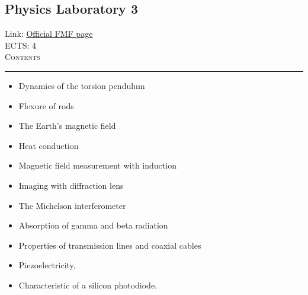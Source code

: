 \documentclass[11pt, a4paper]{article}
\newenvironment{course}[3]{
\subsection{#1}%
Link: \href{#2}{Official FMF page}\\%
ECTS: #3%
\vspace{1ex}
\\
{\large \textsc{Contents}}\\[-0.9ex]%
\rule{\textwidth}{0.5pt}
\vspace{-3ex}
}
{}
\newenvironment{chapter}[1]{
\begin{tcolorbox}[title=#1, breakable]
}
{\end{tcolorbox}}
\begin{document}
\begin{course}{Physics Laboratory 3}{https://www.fmf.uni-lj.si/en/study-physics/programmes/1fiz/2020/7000777/courses/1144/}{4}
    \label{physics-laboratory-3}

    \begin{chapter}{Experiments}
        \begin{itemize}
        
            \item Dynamics of the torsion pendulum

            \item Flexure of rods

            \item The Earth's magnetic field

            \item Heat conduction

            \item Magnetic field measurement with induction

            \item Imaging with diffraction lens

            \item The Michelson interferometer

            \item Absorption of gamma and beta radiation

            \item Properties of transmission lines and coaxial cables

            \item Piezoelectricity, 

            \item Characteristic of a silicon photodiode.        
        
        \end{itemize}
    \end{chapter}

\end{course}
\end{document}
